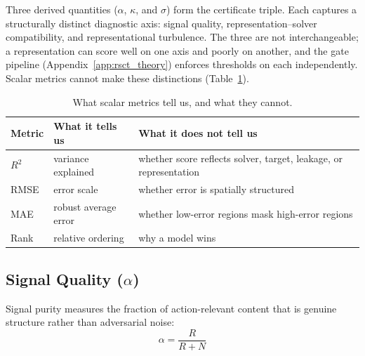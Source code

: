 \documentclass{article}
\begin{document}
Three derived quantities ($\alpha$, $\kappa$, and $\sigma$) form the certificate triple. Each captures a structurally distinct diagnostic axis: signal quality, representation--solver compatibility, and representational turbulence. The three are not interchangeable; a representation can score well on one axis and poorly on another, and the gate pipeline (Appendix~\ref{app:rsct_theory}) enforces thresholds on each independently. Scalar metrics cannot make these distinctions (Table~\ref{tab:metric_limits}).

\begin{table}[htbp]
\centering
\small
\caption{What scalar metrics tell us, and what they cannot.}
\label{tab:metric_limits}
\begin{tabular}{lll}
\toprule
\textbf{Metric} & \textbf{What it tells us} & \textbf{What it does not tell us} \\
\midrule
$R^2$ & variance explained & whether score reflects solver, target, leakage, or representation \\
RMSE & error scale & whether error is spatially structured \\
MAE & robust average error & whether low-error regions mask high-error regions \\
Rank & relative ordering & why a model wins \\
\bottomrule
\end{tabular}
\end{table}

\subsection{\texorpdfstring{Signal Quality ($\alpha$)}{Signal Quality (alpha)}}

Signal purity measures the fraction of action-relevant content that is genuine structure rather than adversarial noise:
\begin{equation}
\alpha = \frac{R}{R + N}
\label{eq:alpha}
\end{equation}
\end{document}
